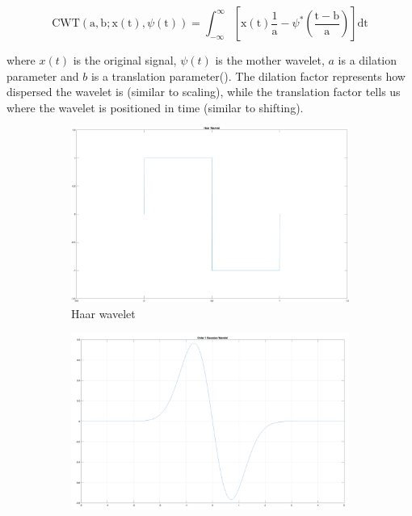 \begin{enumerate}
    \begin{equation*} 
        \text{CWT}(\mathrm{a},\mathrm{b}; \mathrm{x}(\mathrm{t}),\psi(\mathrm{t}))=\int_{-\infty}^{\infty}[\mathrm{x}(\mathrm{t})\frac{1}{\mathrm{a}}-\psi^{*}(\frac{\mathrm{t}-\mathrm{b}}{\mathrm{a}})]\text{dt}
    \end{equation*}

    where \(x(t)\) is the original signal, \(\psi(t)\) is the mother wavelet, \(a\) is a dilation parameter and \(b\) is a translation parameter(\cite{waveletparameter}).
    The dilation factor represents how dispersed the wavelet is (similar to scaling), while the translation factor tells us where the wavelet is
    positioned in time (similar to shifting). 
    
    \begin{figure}
        \centering
        \begin{subfigure}{.4\textwidth}
          \centering
          \includegraphics[width=\linewidth]{Figures/haar.png}
          \caption{Haar wavelet}
          \label{Haar}
        \end{subfigure}
        \hfill
        \begin{subfigure}{.4\textwidth}
            \centering
            \includegraphics[width=\linewidth]{Figures/order1gaussian.png}

\end{subfigure}
\end{figure}
\end{enumerate}
